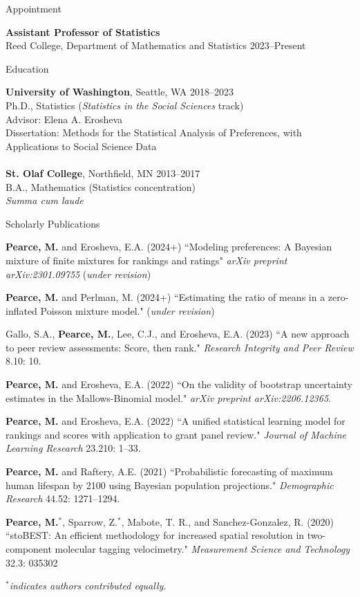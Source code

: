 \documentclass{resume} %
\begin{document}
\begin{rSection}{Appointment}

\textbf{Assistant Professor of Statistics}
\\ Reed College, Department of Mathematics and Statistics \hfill{2023--Present}
\end{rSection}

\begin{rSection}{Education}

\textbf{University of Washington}, Seattle, WA \hfill {2018--2023} 
\\ Ph.D., Statistics ({\it Statistics in the Social Sciences} track)
\\ Advisor: Elena A. Erosheva
\\ Dissertation: Methods for the Statistical Analysis of Preferences, with Applications to Social Science Data
\\
\\\textbf{St. Olaf College}, Northfield, MN \hfill {2013--2017} 
\\ B.A., Mathematics (Statistics concentration)
\\ {\it Summa cum laude}
\end{rSection}


\begin{rSection}{Scholarly Publications}

\textbf{Pearce, M.} and Erosheva, E.A. (2024+) ``Modeling preferences: A Bayesian mixture of finite mixtures for rankings and ratings" \textit{arXiv preprint arXiv:2301.09755} (\textit{under revision})

\textbf{Pearce, M.} and Perlman, M. (2024+) ``Estimating the ratio of means in a zero-inflated Poisson mixture model." (\textit{under revision})

Gallo, S.A., \textbf{Pearce, M.}, Lee, C.J., and Erosheva, E.A. (2023) ``A new approach to peer review assessments: Score, then rank." \textit{Research Integrity and Peer Review} 8.10: 10.

\textbf{Pearce, M.} and Erosheva, E.A. (2022) ``On the validity of bootstrap uncertainty estimates in the Mallows-Binomial model." \textit{arXiv preprint arXiv:2206.12365}.

\textbf{Pearce, M.} and Erosheva, E.A. (2022) ``A unified statistical learning model for rankings and scores with application to grant panel review." \textit{Journal of Machine Learning Research} 23.210: 1--33.

\textbf{Pearce, M.} and Raftery, A.E. (2021) ``Probabilistic forecasting of maximum human lifespan by 2100 using Bayesian population projections." {\em Demographic Research} 44.52: 1271--1294.

\textbf{Pearce, M.}$^*$, Sparrow, Z.$^*$, Mabote, T. R., and Sanchez-Gonzalez, R. (2020) ``stoBEST: An efficient methodology for increased spatial resolution in two-component molecular tagging velocimetry." {\em Measurement Science and Technology} 32.3: 035302

{\em $^*$indicates authors contributed equally.}
\end{rSection}
\end{document}

